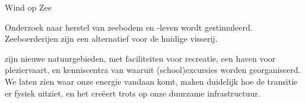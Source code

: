 \begin{voorstel}{Wind op Zee}
\begin{multicols}{2}
\begin{aanbevelingen}
Onderzoek naar herstel van zeebodem en -leven wordt gestimuleerd. Zeeboerderijen zijn een alternatief voor de huidige visserij.

 zijn nieuwe natuurgebieden, met faciliteiten voor recreatie, een haven voor pleziervaart, en kenniscentra van waaruit (school)excursies worden georganiseerd.
We laten zien waar onze energie vandaan komt, maken duidelijk hoe de transitie er fysiek uitziet, en het creëert trots op onze duurzame infrastructuur.

\end{aanbevelingen}
\end{multicols}

\end{voorstel}